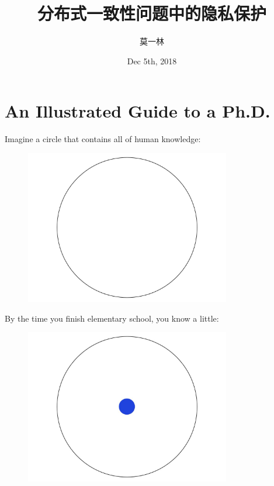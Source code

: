 \documentclass[10pt]{beamer}
\title[Private Consensus]{分布式一致性问题中的隐私保护}
\author[Yilin Mo]{莫一林}
\institute[Tsinghua]{
  清华大学 自动化系
}
\date[Dec 5th, 2018]{Dec 5th, 2018}
\begin{document}
\maketitle 
\section{An Illustrated Guide to a Ph.D.}

\begin{frame}{}
  Imagine a circle that contains all of human knowledge:

  \begin{figure}[hb]
    \centering
    \includegraphics[width=0.8\textwidth]{images/PhDKnowledge-001.png}
  \end{figure}
\end{frame}


\begin{frame}{}
  By the time you finish elementary school, you know a little:
  \begin{figure}[hb]
    \centering
    \includegraphics[width=0.8\textwidth]{images/PhDKnowledge-002.png}
  \end{figure}
\end{frame}
\end{document}
